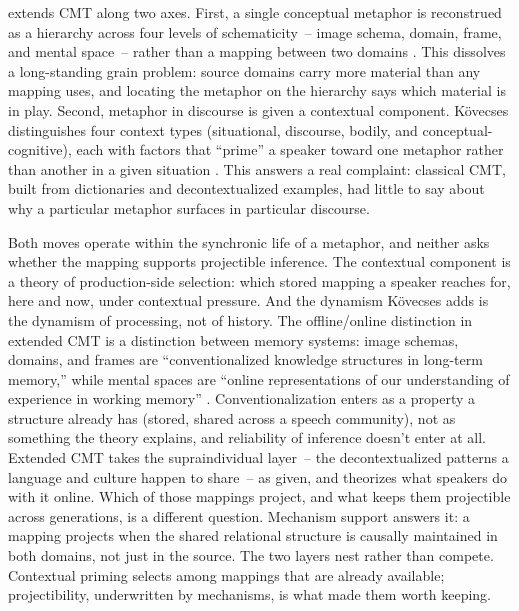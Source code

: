 \textcite{kovecses2017, kovecses2020} extends CMT along two axes. First, a single conceptual metaphor is reconstrued as a hierarchy across four levels of schematicity~-- image schema, domain, frame, and mental space~-- rather than a mapping between two domains \citep{kovecses2017}. This dissolves a long-standing grain problem: source domains carry more material than any mapping uses, and locating the metaphor on the hierarchy says which material is in play. Second, metaphor in discourse is given a contextual component. Kövecses distinguishes four context types (situational, discourse, bodily, and conceptual-cognitive), each with factors that \enquote{prime} a speaker toward one metaphor rather than another in a given situation \citep{kovecses2015, kovecses2020}. This answers a real complaint: classical CMT, built from dictionaries and decontextualized examples, had little to say about why a particular metaphor surfaces in particular discourse.

Both moves operate within the synchronic life of a metaphor, and neither asks whether the mapping supports projectible inference. The contextual component is a theory of production-side selection: which stored mapping a speaker reaches for, here and now, under contextual pressure. And the dynamism Kövecses adds is the dynamism of processing, not of history. The offline/online distinction in extended CMT is a distinction between memory systems: image schemas, domains, and frames are \enquote{conventionalized knowledge structures in long-term memory,} while mental spaces are \enquote{online representations of our understanding of experience in working memory} \citep[326]{kovecses2017}. Conventionalization enters as a property a structure already has (stored, shared across a speech community), not as something the theory explains, and reliability of inference doesn't enter at all. Extended CMT takes the supraindividual layer~-- the decontextualized patterns a language and culture happen to share~-- as given, and theorizes what speakers do with it online. Which of those mappings project, and what keeps them projectible across generations, is a different question. Mechanism support answers it: a mapping projects when the shared relational structure is causally maintained in both domains, not just in the source. The two layers nest rather than compete. Contextual priming selects among mappings that are already available; projectibility, underwritten by mechanisms, is what made them worth keeping.

